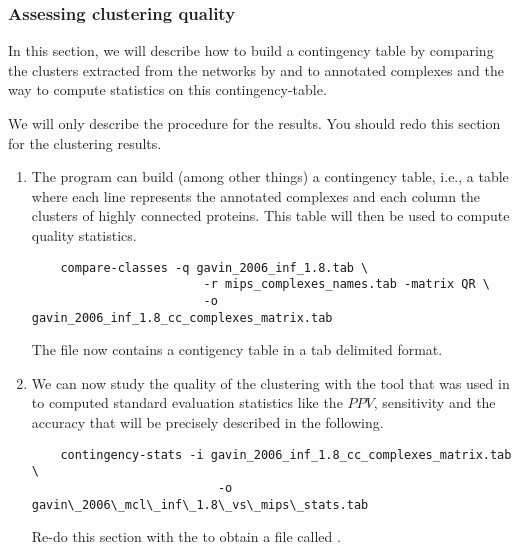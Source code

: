 \subsubsection{Assessing clustering quality}

In this section, we will describe how to build a contingency table by comparing the clusters extracted from the networks by  and  to annotated complexes and the way to compute statistics on this contingency-table.

We will only describe the procedure for the  results. You should redo this section for the  clustering results. 


\begin{enumerate} 

\item The program  can build (among other things) a contingency table, i.e., a table where each line represents the annotated complexes and each column the clusters of highly connected proteins. This table will then be used to compute quality statistics.

	{\color{Blue} \begin{footnotesize} 
		\begin{verbatim}
	compare-classes -q gavin_2006_inf_1.8.tab \
                        -r mips_complexes_names.tab -matrix QR \
                        -o gavin_2006_inf_1.8_cc_complexes_matrix.tab
		\end{verbatim} \end{footnotesize}
	}

The file  now contains a contigency table in a tab delimited format.

\item We can now study the quality of the clustering with the \program{contingency-stats} tool that was used in \cite{Brohee2006} to computed standard evaluation statistics like the $PPV$, sensitivity and the accuracy that will be precisely described in the following.

	{\color{Blue} \begin{footnotesize} 
		\begin{verbatim}
	contingency-stats -i gavin_2006_inf_1.8_cc_complexes_matrix.tab  \
                          -o gavin\_2006\_mcl\_inf\_1.8\_vs\_mips\_stats.tab 
		\end{verbatim} \end{footnotesize}
	}

Re-do this section with the  to obtain a file called .
\end{enumerate} 

